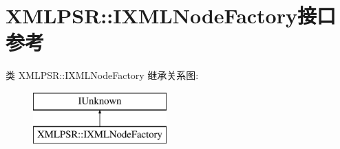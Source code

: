 \hypertarget{interface_x_m_l_p_s_r_1_1_i_x_m_l_node_factory}{}\section{X\+M\+L\+P\+SR\+:\+:I\+X\+M\+L\+Node\+Factory接口 参考}
\label{interface_x_m_l_p_s_r_1_1_i_x_m_l_node_factory}
类 X\+M\+L\+P\+SR\+:\+:I\+X\+M\+L\+Node\+Factory 继承关系图\+:\begin{figure}[H]
\begin{center}
\leavevmode
\includegraphics[height=2.000000cm]{interface_x_m_l_p_s_r_1_1_i_x_m_l_node_factory}
\end{center}
\end{figure}
